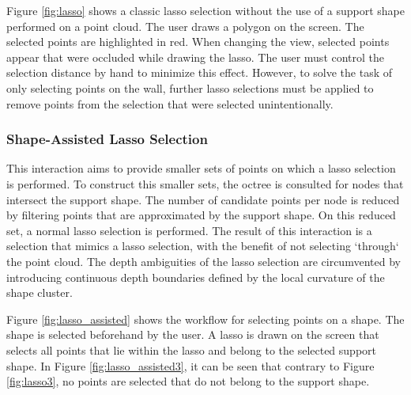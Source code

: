 Figure \ref{fig:lasso} shows a classic lasso selection without the use of a support shape performed on a point cloud. The user draws a polygon on the screen. The selected points are highlighted in red. When changing the view, selected points appear that were occluded while drawing the lasso. The user must control the selection distance by hand to minimize this effect. However, to solve the task of only selecting points on the wall, further lasso selections must be applied to remove points from the selection that were selected unintentionally. 


\subsubsection{Shape-Assisted Lasso Selection}

This interaction aims to provide smaller sets of points on which a lasso selection is performed. To construct this smaller sets, the octree is consulted for nodes that intersect the support shape. The number of candidate points per node is reduced by filtering points that are approximated by the support shape. On this reduced set, a normal lasso selection is performed. The result of this interaction is a selection that mimics a lasso selection, with the benefit of not selecting `through` the point cloud. The depth ambiguities of the lasso selection are circumvented by introducing continuous depth boundaries defined by the local curvature of the shape cluster. 

Figure \ref{fig:lasso_assisted} shows the workflow for selecting points on a shape. The shape is selected beforehand by the user. A lasso is drawn on the screen that selects all points that lie within the lasso and belong to the selected support shape. In Figure \ref{fig:lasso_assisted3}, it can be seen that contrary to Figure \ref{fig:lasso3}, no points are selected that do not belong to the support shape.

